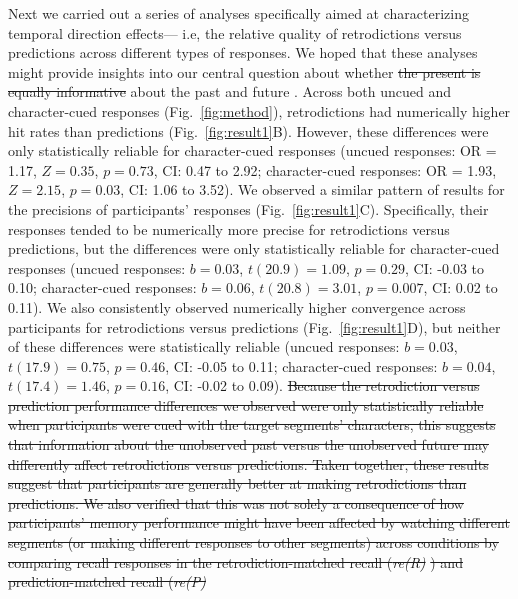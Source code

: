 \documentclass[10pt]{article}
\providecommand{\DIFaddtex}[1]{{\protect\color{blue}\uwave{#1}}} %
\providecommand{\DIFdeltex}[1]{{\protect\color{red}\sout{#1}}}                      %
\providecommand{\DIFaddbegin}{} %
\providecommand{\DIFaddend}{} %
\providecommand{\DIFdelbegin}{} %
\providecommand{\DIFdelend}{} %
\providecommand{\DIFadd}[1]{\texorpdfstring{\DIFaddtex{#1}}{#1}} %
\providecommand{\DIFdel}[1]{\texorpdfstring{\DIFdeltex{#1}}{}} %
\newcommand{\DIFscaledelfig}{0.5}
\newlength{\DIFdelgraphicswidth} %
\newlength{\DIFdelgraphicsheight} %
\newcommand{\DIFaddincludegraphics}[2][]{{\color{blue}\fbox{\DIFOincludegraphics[#1]{#2}}}} %
\newcommand{\DIFdelincludegraphics}[2][]{%
\sbox{\DIFdelgraphicsbox}{\DIFOincludegraphics[#1]{#2}}%
\settoboxwidth{\DIFdelgraphicswidth}{\DIFdelgraphicsbox} %
\settoboxtotalheight{\DIFdelgraphicsheight}{\DIFdelgraphicsbox} %
\scalebox{\DIFscaledelfig}{%
\parbox[b]{\DIFdelgraphicswidth}{\usebox{\DIFdelgraphicsbox}\\[-\baselineskip] \rule{\DIFdelgraphicswidth}{0em}}\llap{\resizebox{\DIFdelgraphicswidth}{\DIFdelgraphicsheight}{%
\setlength{\unitlength}{\DIFdelgraphicswidth}%
\begin{picture}(1,1)%
\thicklines\linethickness{2pt} %
{\color[rgb]{1,0,0}\put(0,0){\framebox(1,1){}}}%
{\color[rgb]{1,0,0}\put(0,0){\line( 1,1){1}}}%
{\color[rgb]{1,0,0}\put(0,1){\line(1,-1){1}}}%
\end{picture}%
}\hspace*{3pt}}} %
} %
\DeclareRobustCommand{\DIFaddbegin}{\DIFOaddbegin \let\includegraphics\DIFaddincludegraphics} %
\DeclareRobustCommand{\DIFaddend}{\DIFOaddend \let\includegraphics\DIFOincludegraphics} %
\DeclareRobustCommand{\DIFdelbegin}{\DIFOdelbegin \let\includegraphics\DIFdelincludegraphics} %
\DeclareRobustCommand{\DIFdelend}{\DIFOaddend \let\includegraphics\DIFOincludegraphics} %
\begin{document}
Next we carried out a series of analyses specifically aimed at characterizing temporal direction effects--- i.e, the relative quality of retrodictions versus predictions across different types of responses. We hoped that these analyses might provide insights into our central question about whether \DIFdelbegin \DIFdel{the present is equally informative }\DIFdelend \DIFaddbegin \DIFadd{inferences }\DIFaddend about the past and future \DIFaddbegin \DIFadd{are equally accurate}\DIFaddend . Across both uncued and character-cued responses \DIFaddbegin \DIFadd{in our main experiment }\DIFaddend (Fig.~\ref{fig:method}), retrodictions had numerically higher hit rates than predictions (Fig.~\ref{fig:result1}B). However, these differences were only statistically reliable for character-cued responses (uncued responses: OR = 1.17, $Z = 0.35$, $p = 0.73$, CI: 0.47 to 2.92; character-cued responses: OR = 1.93, $Z = 2.15$, $p = 0.03$, CI: 1.06 to 3.52). We observed a similar pattern of results for the precisions of participants' responses (Fig.~\ref{fig:result1}C). Specifically, their responses tended to be numerically more precise for retrodictions versus predictions, but the differences were only statistically reliable for character-cued responses (uncued responses: $b = 0.03$, $t(20.9) = 1.09$, $p = 0.29$, CI: -0.03 to 0.10; character-cued responses: $b = 0.06$, $t(20.8) = 3.01$, $p = 0.007$, CI: 0.02 to 0.11). We also consistently observed numerically higher convergence across participants for retrodictions versus predictions (Fig.~\ref{fig:result1}D), but neither of these differences were statistically reliable (uncued responses: $b = 0.03$, $t(17.9) = 0.75$, $p = 0.46$, CI: -0.05 to 0.11; character-cued responses: $b = 0.04$, $t(17.4) = 1.46$, $p = 0.16$, CI: -0.02 to 0.09).  \DIFdelbegin \DIFdel{Because the retrodiction versus prediction performance differences we observed were only statistically reliable when participants were cued with the target segments' characters, this suggests that information about the unobserved past versus the unobserved future may differently affect retrodictions versus predictions.  Taken together, these results suggest that participants are generally better at making retrodictions than predictions.  We also verified that this was not solely a consequence of how participants' memory performance might have been affected by watching different segments (or making different responses to other segments) across conditions by comparing recall responses in the retrodiction-matched recall (}\textit{\DIFdel{re(R)}}%
\DIFdel{) and prediction-matched recall (}\textit{\DIFdel{re(P)}}%
\end{document}
